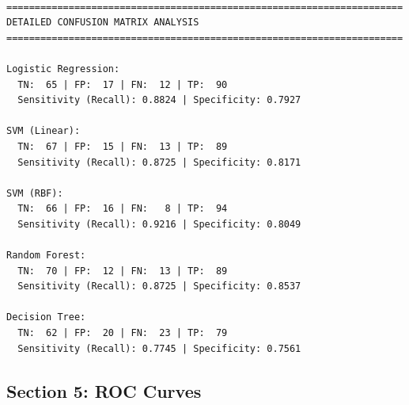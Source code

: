 \documentclass[11pt]{article}
\begin{document}
    \begin{Verbatim}[commandchars=\\\{\}]

======================================================================
DETAILED CONFUSION MATRIX ANALYSIS
======================================================================

Logistic Regression:
  TN:  65 | FP:  17 | FN:  12 | TP:  90
  Sensitivity (Recall): 0.8824 | Specificity: 0.7927

SVM (Linear):
  TN:  67 | FP:  15 | FN:  13 | TP:  89
  Sensitivity (Recall): 0.8725 | Specificity: 0.8171

SVM (RBF):
  TN:  66 | FP:  16 | FN:   8 | TP:  94
  Sensitivity (Recall): 0.9216 | Specificity: 0.8049

Random Forest:
  TN:  70 | FP:  12 | FN:  13 | TP:  89
  Sensitivity (Recall): 0.8725 | Specificity: 0.8537

Decision Tree:
  TN:  62 | FP:  20 | FN:  23 | TP:  79
  Sensitivity (Recall): 0.7745 | Specificity: 0.7561
    \end{Verbatim}

    \subsection{Section 5: ROC Curves}\label{section-5-roc-curves}
\end{document}
